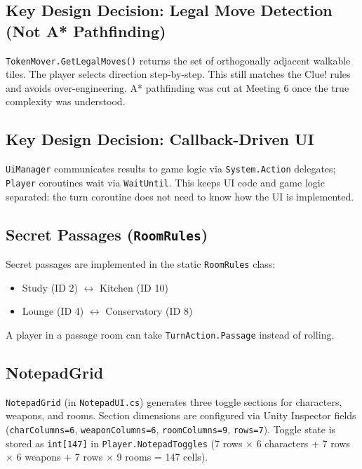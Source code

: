\subsection*{Key Design Decision: Legal Move Detection (Not A* Pathfinding)}

\texttt{TokenMover.GetLegalMoves()} returns the set of orthogonally adjacent walkable tiles. The player selects direction step-by-step. This still matches the Clue! rules and avoids over-engineering. A* pathfinding was cut at Meeting 6 once the true complexity was understood.

\subsection*{Key Design Decision: Callback-Driven UI}

\texttt{UiManager} communicates results to game logic via \texttt{System.Action} delegates; \texttt{Player} coroutines wait via \texttt{WaitUntil}. This keeps UI code and game logic separated: the turn coroutine does not need to know how the UI is implemented.

\subsection*{Secret Passages (\texttt{RoomRules})}

Secret passages are implemented in the static \texttt{RoomRules} class:
\begin{itemize}
    \item Study (ID 2) $\leftrightarrow$ Kitchen (ID 10)
    \item Lounge (ID 4) $\leftrightarrow$ Conservatory (ID 8)
\end{itemize}
A player in a passage room can take \texttt{TurnAction.Passage} instead of rolling.

\subsection*{NotepadGrid}

\texttt{NotepadGrid} (in \texttt{NotepadUI.cs}) generates three toggle sections for characters, weapons, and rooms. Section dimensions are configured via Unity Inspector fields (\texttt{charColumns=6}, \texttt{weaponColumns=6}, \texttt{roomColumns=9}, \texttt{rows=7}). Toggle state is stored as \texttt{int[147]} in \texttt{Player.NotepadToggles} (7 rows $\times$ 6 characters + 7 rows $\times$ 6 weapons + 7 rows $\times$ 9 rooms = 147 cells).


